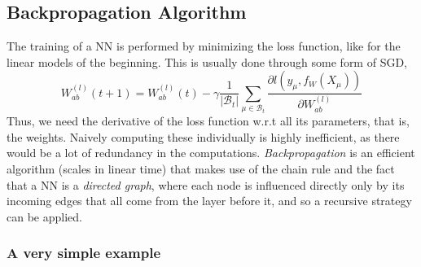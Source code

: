 \documentclass{article}
\begin{document}
\subsection{Backpropagation Algorithm}
The training of a NN is performed by minimizing the loss function, like for the linear models of the beginning. This is usually done through some form of SGD,
\begin{equation}
    W^{(l)}_{a b} (t+1)
    =
    W^{(l)}_{a b} (t)
    - \gamma \frac{1}{|\mathcal{B}_t|}
    \sum_{\mu \in \mathcal{B}_t}
    \frac{\partial l(y_{\mu}, f_W(X_{\mu}))}{\partial W^{(l)}_{a b}}
\end{equation}
Thus, we need the derivative of the loss function w.r.t all its parameters, that is, the weights. Naively computing these individually is highly inefficient, as there would be a lot of redundancy in the computations. \emph{Backpropagation} is an efficient algorithm (scales in linear time) that makes use of the chain rule and the fact that a NN is a \emph{directed graph}, where each node is influenced directly only by its incoming edges that all come from the layer before it, and so a recursive strategy can be applied.


\subsubsection*{A very simple example}
\end{document}
